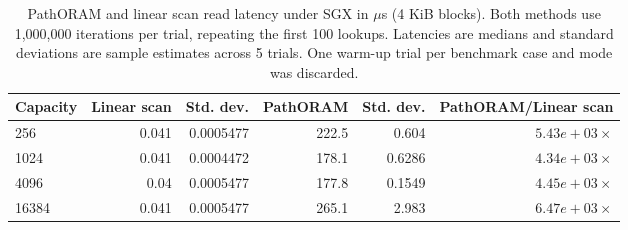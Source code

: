 \begin{table}
\centering
\small
\setlength{\tabcolsep}{4pt}
\begin{tabular}{lrrrrr}
\toprule
Capacity & Linear scan & Std. dev. & PathORAM & Std. dev. & PathORAM/Linear scan \\
\midrule
256 & 0.041 & 0.0005477 & 222.5 & 0.604 & $5.43e+03\times$ \\
1024 & 0.041 & 0.0004472 & 178.1 & 0.6286 & $4.34e+03\times$ \\
4096 & 0.04 & 0.0005477 & 177.8 & 0.1549 & $4.45e+03\times$ \\
16384 & 0.041 & 0.0005477 & 265.1 & 2.983 & $6.47e+03\times$ \\
\bottomrule
\end{tabular}
\caption{PathORAM and linear scan read latency under SGX in ${}\mu$s (4 KiB blocks). Both methods use 1,000,000 iterations per trial, repeating the first 100 lookups. Latencies are medians and standard deviations are sample estimates across 5 trials. One warm-up trial per benchmark case and mode was discarded.}
\label{tab:reproduction-table6-1m}
\end{table}
